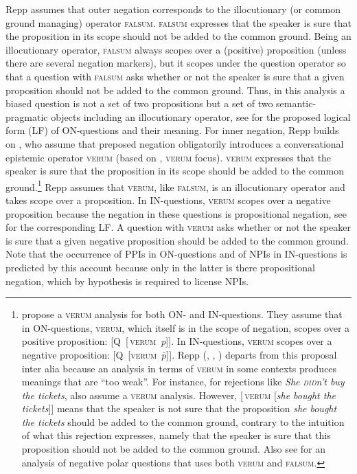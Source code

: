 \documentclass[output=paper,colorlinks,citecolor=brown]{langscibook}
\begin{document}
Repp assumes that outer negation corresponds to the illocutionary (or common ground managing) operator \textsc{falsum}. \textsc{falsum} expresses that the speaker is sure that the proposition in its scope should not be added to the common ground. Being an illocutionary operator, \textsc{falsum} always scopes over a (positive) proposition (unless there are several negation markers), but it scopes under the question operator so that a question with \textsc{falsum} asks whether or not the speaker is sure that a given proposition should not be added to the common ground. Thus, in this analysis a biased question is not a set of two propositions but a set of two semantic-pragmatic objects including an illocutionary operator, see  for the proposed logical form (LF) of ON-questions and their meaning. For inner negation, Repp builds on \citet{RomeroHan2004}, who assume that preposed negation obligatorily introduces a conversational epistemic operator \textsc{verum} (based on , \citeyear{Hoehle1992} \textsc{verum} focus). \textsc{verum} expresses that the speaker is sure that the proposition in its scope should be added to the common ground.\footnote{\citet{RomeroHan2004} propose a \textsc{verum} analysis for both ON- and IN-questions. They assume that in ON-questions, \textsc{verum}, which itself is in the scope of negation, scopes over a positive proposition: [Q~[\neg\,\textsc{verum}~\textit{p}]]. In IN-questions, \textsc{verum} scopes over a negative proposition: [Q~[\textsc{verum}~$\bar{p}$]]. Repp (\citeyear{Repp2006}, \citeyear{Repp2009}, \citeyear{Repp2013}) departs from this proposal inter alia because an analysis in terms of \textsc{verum} in some contexts produces meanings that are ``too weak''. For instance, for rejections like \textit{She \textsc{did}n’t buy the tickets}, \citet{RomeroHan2004} also assume a \textsc{verum} analysis. However, [\neg\,\textsc{verum} [\textit{she bought the tickets}]] means that the speaker is not sure that the proposition \textit{she bought the tickets} should be added to the common ground, contrary to the intuition of what this rejection expresses, namely that the speaker is sure that this proposition should not be added to the common ground. Also see \citet{Romero2015} for an analysis of negative polar questions that uses both \textsc{verum} and \textsc{falsum}.}  Repp assumes that \textsc{verum}, like \textsc{falsum}, is an illocutionary operator and takes scope over a proposition. In IN-questions, \textsc{verum} scopes over a negative proposition because the negation in these questions is propositional negation, see  for the corresponding LF. A question with \textsc{verum} asks whether or not the speaker is sure that a given negative proposition should be added to the common ground. Note that the occurrence of PPIs in ON-questions and of NPIs in IN-questions is predicted by this account because only in the latter is there propositional negation, which by hypothesis is required to license NPIs.
\end{document}
